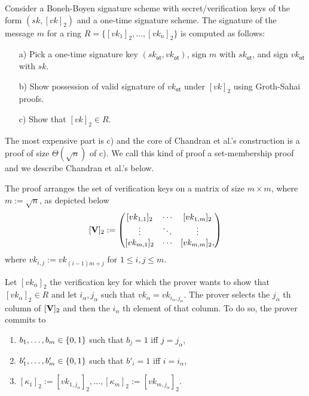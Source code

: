 

Consider a {Boneh-Boyen signature scheme} with secret/verification keys of the form $(sk,[vk]_2)$ and a {one-time signature scheme}. The signature of the message $m$ for a ring $R=\{[vk_1]_2,\ldots,[vk_n]_2\}$ is computed as follows:
\begin{itemize}
	\item[a)] Pick a one-time signature key $(sk_\mathsf{ot},vk_\mathsf{ot})$, sign $m$ with $sk_\mathsf{ot}$, and sign $vk_\mathsf{ot}$ with $sk$.
	\item[b)] Show possession of valid signature of $vk_\mathsf{ot}$ under $[vk]_2$ using Groth-Sahai proofs.
	\item[c)] Show that $[vk]_2\in R$.
\end{itemize}
The most expensive part is c) and the core of Chandran et al.'s construction is a proof of size $\Theta(\sqrt{n})$ of c). We call this kind of proof a set-membership proof and we describe Chandran et al.'s below.
 
The proof arranges the set of verification keys on a matrix of size $m\times m$, where $m:=\sqrt{n}$, as depicted below
$$
[\mathbf{{V}}]_2:=
\begin{pmatrix}
[vk_{1,1}]_2 & \cdots & [vk_{1,m}]_2\\
\vdots     & \ddots & \vdots \\
[vk_{m,1}]_2  & \cdots & [vk_{m,m}]_2,
\end{pmatrix}
$$
where $vk_{i,j}:=vk_{(i-1)m+j}$ for $1\leq i,j \leq m$.

Let $[vk_\alpha]_2$ the verification key for which the prover wants to show that $[vk_\alpha]_2\in R$ and let $i_\alpha,j_\alpha$ such that $vk_\alpha = vk_{i_\alpha,j_\alpha}$. The prover selects the $j_\alpha$ th column of $[\mathbf{{V}}]_2$ and then the $i_\alpha$ th element of that column. To do so, the prover commits to 
\begin{enumerate}
\item $b_1,\ldots,b_m\in\{0,1\}$ such that $b_j=1$ iff $j=j_\alpha$,
\item $b'_1,\ldots,b'_m\in\{0,1\}$ such that $b'_i=1$ iff $i=i_\alpha$,
\item $[\kappa_1]_2:=[vk_{1,j_\alpha}]_2,\ldots,[\kappa_m]_2:=[vk_{m,j_\alpha}]_2$.
\end{enumerate}

